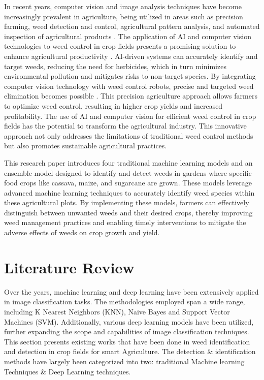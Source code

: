 \documentclass[10pt,twocolumn,letterpaper]{article}
\begin{document}
In recent years, computer vision and image analysis techniques have become increasingly prevalent in agriculture, being utilized in areas such as precision farming, weed detection and control, agricultural pattern analysis, and automated inspection of agricultural products \cite{Pun}. The application of AI and computer vision technologies to weed control in crop fields presents a promising solution to enhance agricultural productivity \cite{Chlingaryan}. AI-driven systems can accurately identify and target weeds, reducing the need for herbicides, which in turn minimizes environmental pollution and mitigates risks to non-target species. By integrating computer vision technology with weed control robots, precise and targeted weed elimination becomes possible \cite{Timmermans}. This precision agriculture approach allows farmers to optimize weed control, resulting in higher crop yields and increased profitability. The use of AI and computer vision for efficient weed control in crop fields has the potential to transform the agricultural industry. This innovative approach not only addresses the limitations of traditional weed control methods but also promotes sustainable agricultural practices.

This research paper introduces four traditional machine learning models and an ensemble model designed to identify and detect weeds in gardens where specific food crops like cassava, maize, and sugarcane are grown. These models leverage advanced machine learning techniques to accurately identify weed species within these agricultural plots. By implementing these models, farmers can effectively distinguish between unwanted weeds and their desired crops, thereby improving weed management practices and enabling timely interventions to mitigate the adverse effects of weeds on crop growth and yield.

\section{Literature Review}
Over the years, machine learning and deep learning have been extensively applied in image classification tasks. The methodologies employed span a wide range, including K Nearest Neighbors (KNN), Naive Bayes and Support Vector Machines (SVM). Additionally, various deep learning models have been utilized, further expanding the scope and capabilities of image classification techniques. This section presents existing works that have been done in weed identification and detection in crop fields for smart Agriculture. The detection \& identification methods have largely been categorized into two: traditional Machine learning Techniques \& Deep Learning techniques.
\end{document}
